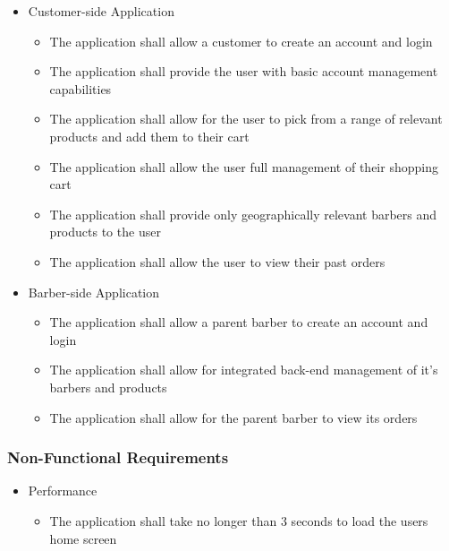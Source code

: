 \documentclass[12pt]{article}
\begin{document}
	\begin{itemize}
		\item Customer-side Application
		\begin{itemize}
			\item The application shall allow a customer to create an account and login
			\item The application shall provide the user with basic account management capabilities
			\item The application shall allow for the user to pick from a range of relevant products and add them to their cart
			\item The application shall allow the user full management of their shopping cart
			\item The application shall provide only geographically relevant barbers and products to the user
			\item The application shall allow the user to view their past orders
			
		\end{itemize}
	\end{itemize}

	\begin{itemize}
		\item Barber-side Application
		\begin{itemize}
			\item The application shall allow a parent barber to create an account and login
			\item The application shall allow for integrated back-end management of it's barbers and products
			\item The application shall allow for the parent barber to view its orders
		\end{itemize}
	\end{itemize}
	
	\subsubsection{Non-Functional Requirements}
	
	\begin{itemize}
		\item Performance
		\begin{itemize}
			\item The application shall take no longer than 3 seconds to load the users home screen
		\end{itemize}
	\end{itemize}
\end{document}
